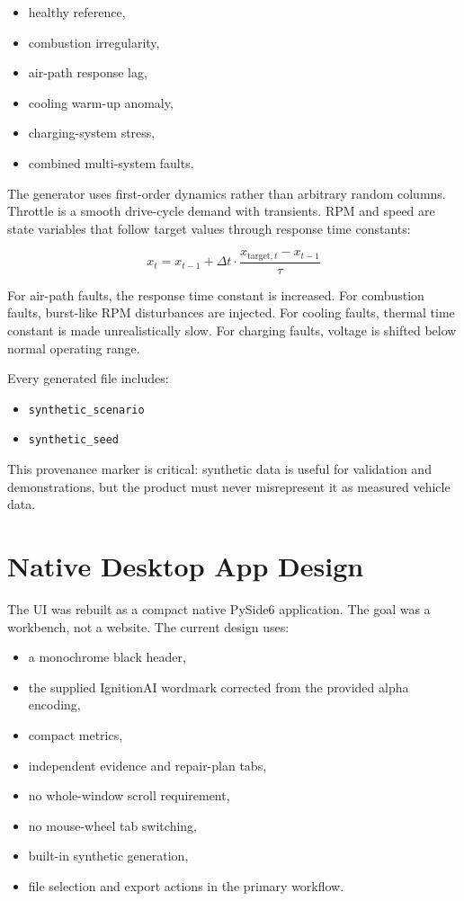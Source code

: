 \documentclass[11pt,a4paper]{article}
\begin{document}
\begin{itemize}
\item healthy reference,
\item combustion irregularity,
\item air-path response lag,
\item cooling warm-up anomaly,
\item charging-system stress,
\item combined multi-system faults.
\end{itemize}

The generator uses first-order dynamics rather than arbitrary random columns. Throttle is a smooth drive-cycle demand with transients. RPM and speed are state variables that follow target values through response time constants:

\[
x_t = x_{t-1} + \Delta t \cdot \frac{x_{\mathrm{target},t} - x_{t-1}}{\tau}
\]

For air-path faults, the response time constant is increased. For combustion faults, burst-like RPM disturbances are injected. For cooling faults, thermal time constant is made unrealistically slow. For charging faults, voltage is shifted below normal operating range.

Every generated file includes:

\begin{itemize}
\item \texttt{synthetic\_scenario}
\item \texttt{synthetic\_seed}
\end{itemize}

This provenance marker is critical: synthetic data is useful for validation and demonstrations, but the product must never misrepresent it as measured vehicle data.

\section{Native Desktop App Design}

The UI was rebuilt as a compact native PySide6 application. The goal was a workbench, not a website. The current design uses:

\begin{itemize}
\item a monochrome black header,
\item the supplied IgnitionAI wordmark corrected from the provided alpha encoding,
\item compact metrics,
\item independent evidence and repair-plan tabs,
\item no whole-window scroll requirement,
\item no mouse-wheel tab switching,
\item built-in synthetic generation,
\item file selection and export actions in the primary workflow.
\end{itemize}
\end{document}
